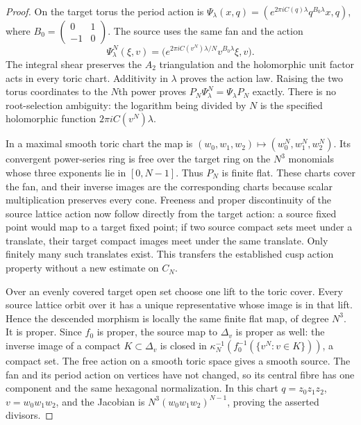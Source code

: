 \begin{proof}
On the target torus the period action is
$\Psi_\lambda(x,q)=(e^{2\pi iC(q)\lambda}q^{B_0\lambda}x,q)$,
where $B_0=\left(\begin{smallmatrix}0&1\\-1&0\end{smallmatrix}\right)$.
The source uses the same fan and the action
\[
 \Psi^N_\lambda(\xi,v)=
 \big(e^{2\pi iC(v^N)\lambda/N}v^{B_0\lambda}\xi,v\big).
\]
The integral shear preserves the $A_2$ triangulation and the
holomorphic unit factor acts in every toric chart. Additivity in $\lambda$
proves the action law. Raising the two torus coordinates to the $N$th
power proves $P_N\Psi^N_\lambda=\Psi_\lambda P_N$ exactly.
There is no root-selection ambiguity: the logarithm being divided by $N$
is the specified holomorphic function $2\pi iC(v^N)\lambda$.

In a maximal smooth toric chart the map is
$(w_0,w_1,w_2)\mapsto(w_0^N,w_1^N,w_2^N)$. Its convergent power-series
ring is free over the target ring on the $N^3$ monomials whose three
exponents lie in $[0,N-1]$. Thus $P_N$ is finite flat. These charts cover
the fan, and their inverse images are the corresponding charts because
scalar multiplication preserves every cone. Freeness and proper
discontinuity of the source lattice action now follow directly from the
target action: a source fixed point would map to a target fixed point;
if two source compact sets meet under a translate, their target compact
images meet under the same translate. Only finitely many such translates
exist. This transfers the established cusp action property without a new
estimate on $C_N$.

Over an evenly covered target open set choose one lift to the toric
cover. Every source lattice orbit over it has a unique representative
whose image is in that lift. Hence the descended morphism is locally the
same finite flat map, of degree $N^3$. It is proper. Since $f_0$ is proper,
the source map to $\Delta_v$ is proper as well: the inverse image of a
compact $K\subset\Delta_v$ is closed in
$\kappa_N^{-1}(f_0^{-1}(\{v^N:v\in K\}))$, a compact set.
The free action on a smooth toric space gives a smooth source. The fan and
its period action on vertices have not changed, so its central fibre has
one component and the same hexagonal normalization. In this chart
$q=z_0z_1z_2$, $v=w_0w_1w_2$, and the Jacobian is
$N^3(w_0w_1w_2)^{N-1}$, proving the asserted divisors.


\end{proof}
